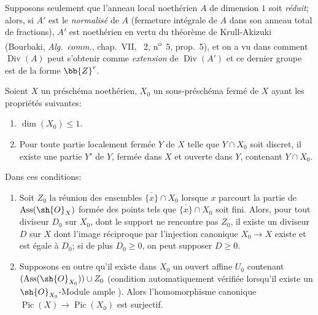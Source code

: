 \begin{env}[21.9.10]
\label{IV.21.9.10}
Supposons seulement que l'anneau local noethérien $A$ de dimension $1$ soit \emph{réduit};
alors, si $A'$ est le \emph{normalisé} de $A$ (fermeture intégrale de $A$ dans son anneau total de fractions), $A'$ est noethérien en vertu du théorème de Krull-Akizuki (Bourbaki, \emph{Alg.\ comm.}, chap.~VII, \textsection~2, n\textsuperscript{o}~5, prop.~5), et on a vu dans  comment
$\operatorname{Div}(A)$ peut s'obtenir comme \emph{extension} de $\operatorname{Div}(A')$ et ce dernier groupe est de la forme $\bb{Z}^r$.
\end{env}

\begin{proposition}[21.9.11]
\label{IV.21.9.11}
Soient $X$ un préschéma noethérien, $X_0$ un sous-préschéma fermé de $X$ ayant les propriétés suivantes:
\begin{enumerate}
  \item[\rm 1\textsuperscript{o}] $\dim(X_0)\leq1$.
  \item[\rm 2\textsuperscript{o}] Pour toute partie localement fermée $Y$ de $X$ telle que $Y\cap X_0$ soit discret, il existe une partie $Y'$ de $Y$, fermée dans $X$ et ouverte dans $Y$, contenant $Y\cap X_0$.
\end{enumerate}

Dans ces conditions:
\begin{enumerate}[label=\textup{(\roman*)}]
  \item Soit $Z_0$ la réunion des ensembles $\overline{\{x\}}\cap X_0$ lorsque $x$ parcourt la partie de $\operatorname{Ass}(\sh{O}_X)$ formée des points tels que $\overline{\{x\}}\cap X_0$ soit fini.
Alors, pour tout diviseur $D_0$ sur $X_0$, dont le support ne rencontre pas $Z_0$, il existe un diviseur $D$ sur $X$ dont l'image réciproque par l'injection canonique $X_0\to X$ existe  et est égale à $D_0$;
si de plus $D_0\geq0$, on peut supposer $D\geq0$.

  \item Supposons en outre qu'il existe dans $X_0$ un ouvert affine $U_0$ contenant $(\operatorname{Ass}(\sh{O}_{X_0}))\cup Z_0$ \textup{(}condition automatiquement vérifiée lorsqu'il existe un $\sh{O}_{X_0}$-Module ample \textup{)}.
Alors l'homomorphisme canonique  $\operatorname{Pic}(X)\to\operatorname{Pic}(X_0)$ est surjectif.
\end{enumerate}
\end{proposition}

